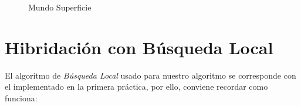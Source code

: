 \begin{figure}[H]
	\centering
	\begin{minipage}{.75\linewidth}
		
		\begin{algorithm}[H] 
			\caption{Mundo Superficie }
			\SetAlgoLined
			
			
			
		\end{algorithm}
	\end{minipage}
\end{figure}











\newpage 
\section{Hibridación con Búsqueda Local}
\hspace{1.5cm}El algoritmo de \textit{Búsqueda Local} usado para nuestro algoritmo se corresponde con el implementado en la primera práctica, por ello, conviene recordar como funciona: 

